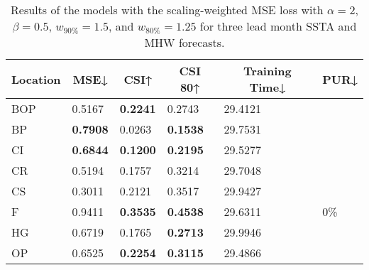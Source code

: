 \documentclass[11pt, a4paper]{article}
\begin{document}
\begin{table}[H]
\centering
\small
\caption{Results of the models with the scaling-weighted MSE loss with $\alpha=2$, $\beta=0.5$, $w_{90\%}=1.5$, and $w_{80\%}=1.25$ for three lead month SSTA and MHW forecasts.}
\begin{tabular}{llllll}
\multicolumn{1}{c}{\textbf{Location}} & \multicolumn{1}{c}{\textbf{MSE↓}} & \multicolumn{1}{c}{\textbf{CSI↑}} & \multicolumn{1}{c}{\textbf{CSI 80↑}} & \multicolumn{1}{c}{\textbf{Training Time↓}} & \multicolumn{1}{c}{\textbf{PUR↓}} \\ \hline
BOP                         & 0.5167                            & \textbf{0.2241}                   & 0.2743                               & 29.4121                                     &                                   \\
BP                        & \textbf{0.7908}                   & 0.0263                            & \textbf{0.1538}                      & 29.7531                                     &                                   \\
CI                        & \textbf{0.6844}                   & \textbf{0.1200}                   & \textbf{0.2195}                      & 29.5277                                     &                                   \\
CR                           & 0.5194                            & 0.1757                            & 0.3214                               & 29.7048                                     &                                   \\
CS                           & 0.3011                            & 0.2121                            & 0.3517                               & 29.9427                                     &                                   \\
F                             & 0.9411                            & \textbf{0.3535}                   & \textbf{0.4538}                      & 29.6311                                     & 0\%                               \\
HG                          & 0.6719                            & 0.1765                            & \textbf{0.2713}                      & 29.9946                                     &                                   \\
OP                       & 0.6525                            & \textbf{0.2254}                   & \textbf{0.3115}                      & 29.4866                                     &                                   \\

\end{tabular}
\end{table}
\end{document}

